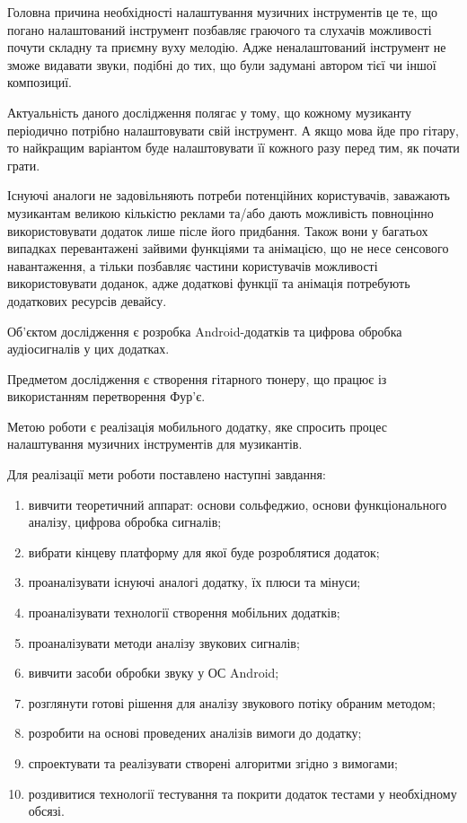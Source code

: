 
Головна причина необхідності налаштування музичних інструментів це те, що погано налаштований інструмент позбавляє граючого та слухачів можливості почути складну та приємну вуху мелодію. Адже неналаштований інструмент не зможе видавати звуки, подібні до тих, що були задумані автором тієї чи іншої композициї.

Актуальність даного дослідження полягає у тому, що кожному музиканту періодично потрібно налаштовувати свій інструмент. А якщо мова йде про гітару, то найкращим варіантом буде налаштовувати її кожного разу перед тим, як почати грати.

Існуючі аналоги не задовільняють потреби потенційних користувачів, заважають музикантам великою кількістю реклами та/або дають можливість повноцінно використовувати додаток лише післе його придбання. Також вони у багатьох випадках перевантажені зайвими функціями та анімацією, що не несе сенсового навантаження, а тільки позбавляє частини користувачів можливості використовувати доданок, адже додаткові функції та анімація потребують додаткових ресурсів девайсу.

Об'єктом дослідження є розробка Android-додатків та цифрова обробка аудіосигналів у цих додатках.

Предметом дослідження є створення гітарного тюнеру, що працює із використанням перетворення Фур'є.

Метою роботи є реалізація мобильного додатку, яке спросить процес налаштування музичних інструментів для музикантів.

Для реалізації мети роботи поставлено наступні завдання:
\begin{enumerate}
	\item вивчити теоретичний аппарат: основи сольфеджио, основи функціонального аналізу, цифрова обробка сигналів;

    \item вибрати кінцеву платформу для якої буде розроблятися додаток;

    \item проаналізувати існуючі аналогі додатку, їх плюси та мінуси;

    \item проаналізувати технології створення мобільних додатків;

    \item проаналізувати методи аналізу звукових сигналів;

    \item вивчити засоби обробки звуку у ОС Android;

    \item розглянути готові рішення для аналізу звукового потіку обраним методом;

    \item розробити на основі проведених аналізів вимоги до додатку;

    \item спроектувати та реалізувати створені алгоритми згідно з вимогами;

    \item роздивитися технології тестування та покрити додаток тестами у необхідному обсязі.
\end{enumerate}

